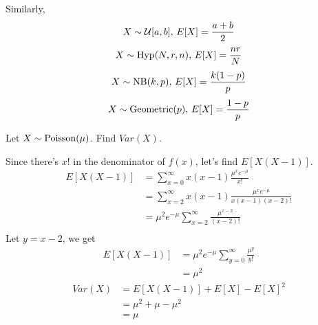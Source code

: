 Similarly,
\[ X \sim \operatorname{\mathcal{U}}[a,b],\, E[X]=\frac{a+b}{2} \]
\[ X \sim \operatorname{Hyp}(N,r,n),\, E[X]=\frac{nr}{N} \]
\[ X \sim \operatorname{NB}(k,p),\,E[X]=\frac{k(1-p)}{p} \]
\[ X \sim \operatorname{Geometric}(p),\,E[X]=\frac{1-p}{p} \]

Let $ X \sim \operatorname{Poisson}(\mu) $. Find $ Var(X) $.

Since there's $ x! $ in the denominator of $ f(x) $, let's find
$ E[X(X-1)] $.
\begin{align*}
    E[X(X-1)] & =\sum\limits_{x=0}^{\infty}x(x-1)\frac{\mu^x e^{-\mu}}{x!}           \\
              & =\sum\limits_{x=2}^{\infty}x(x-1)\frac{\mu^x e^{-\mu}}{x(x-1)(x-2)!} \\
              & =\mu^2e^{-\mu}\sum\limits_{x=2}^{\infty} \frac{\mu^{x-2}}{(x-2)!}    \\
\end{align*}
Let $ y=x-2 $, we get
\begin{align*}
    E[X(X-1)] & =\mu^2e^{-\mu}\sum\limits_{y=0}^{\infty} \frac{\mu^{y}}{y!} \\
              & =\mu^2
\end{align*}
\begin{align*}
    Var(X) & =E[X(X-1)]+E[X]-E[X]^2 \\
           & =\mu^2+\mu-\mu^2       \\
           & =\mu
\end{align*}

